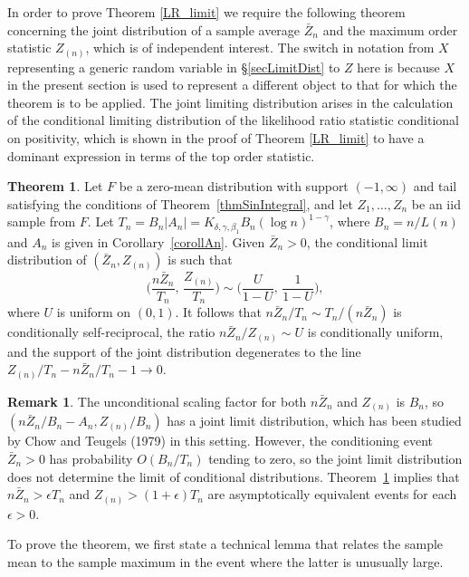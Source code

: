 \documentclass[11pt]{article}
\theoremstyle{definition}
\newtheorem{theorem}{Theorem}[section]
\newtheorem{remark}{Remark}[section]
\def\Zmax{Z_{(n)}}
\begin{document}
In order to prove Theorem \ref{LR_limit} we require the following theorem concerning the joint distribution of a sample average $\bar Z_n$ and the maximum order statistic $\Zmax$, which is of independent interest. The switch in notation from $X$ representing a generic random variable in \S \ref{secLimitDist} to $Z$ here is because $X$ in the present section is used to represent a different object to that for which the theorem is to be applied. The joint limiting distribution arises in the calculation of the conditional limiting distribution of the likelihood ratio statistic conditional on positivity, which is shown in the proof of Theorem \ref{LR_limit} to have a dominant expression in terms of the top order statistic.


\begin{theorem}\label{cjl_theorem}
	Let $F$ be a zero-mean distribution with support $(-1, \infty)$ and tail satisfying the conditions of Theorem~\ref{thmSinIntegral}, and let $Z_1,\ldots, Z_n$ be an iid sample from $F$. Let $T_n = B_n|A_n| = K_{\delta,\gamma,\beta_1} B_n (\log n)^{1-\gamma}$, where $B_n=n/L(n)$ and $A_n$ is given in Corollary~\ref{corollAn}.
	Given $\bar Z_n > 0$, the conditional limit distribution of $(\bar Z_n, \Zmax)$ is such that
	\[
	\biggl(\frac{n\bar Z_n} {T_n},\, \frac{\Zmax} {T_n} \biggr) \sim \biggl(\frac U{1-U},\, \frac 1 {1-U} \biggr),
	\]
	where $U$ is uniform on $(0, 1)$.
	It follows that $n\bar Z_n/T_n \sim T_n / (n\bar Z_n)$ is conditionally self-reciprocal,
	the ratio $n\bar Z_n / \Zmax \sim U$ is conditionally uniform, 
	and the support of the joint distribution degenerates to the line $\Zmax/T_n - n\bar Z_n/T_n -1  \to 0$.
\end{theorem}

\begin{remark}
	The unconditional scaling factor for both $n\bar Z_n$ and $\Zmax$ is $B_n$, so
	$(n\bar Z_n/B_n - A_n, \Zmax/B_n)$ has a joint limit distribution, which has been studied by
	Chow and Teugels (1979) in this setting.
	However, the conditioning event $\bar Z_n > 0$ has probability $O(B_n/T_n)$ tending to zero, so
	the joint limit distribution does not determine the limit of conditional distributions.
	Theorem~\ref{cjl_theorem} implies that $n\bar Z_n > \epsilon T_n$ and $\Zmax > (1+\epsilon)T_n$ are asymptotically equivalent events for each $\epsilon > 0$.
\end{remark}


To prove the theorem, we first state a technical lemma that relates the sample mean to the sample maximum in the event where the latter is unusually large.
\end{document}
